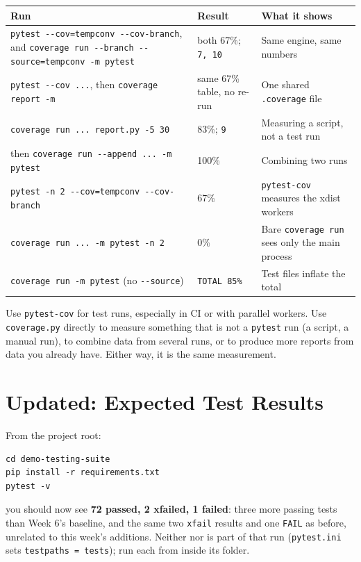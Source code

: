 \documentclass[11pt]{article}
\begin{document}
\begin{center}
\footnotesize
\begin{tabular}{@{}L{6.4cm}L{3.6cm}L{4.6cm}@{}}
\toprule
\textbf{Run} & \textbf{Result} & \textbf{What it shows} \\
\midrule
\texttt{pytest -{}-cov=tempconv -{}-cov-branch}, and
\texttt{coverage run -{}-branch -{}-source=tempconv -m pytest}
& both 67\%; \texttt{7, 10} & Same engine, same numbers \\
\texttt{pytest -{}-cov ...}, then \texttt{coverage report -m} & same
67\% table, no re-run & One shared \texttt{.coverage} file \\
\texttt{coverage run ... report.py -5 30} & 83\%; \texttt{9} & Measuring
a script, not a test run \\
then \texttt{coverage run -{}-append ... -m pytest} & 100\% & Combining
two runs \\
\texttt{pytest -n 2 -{}-cov=tempconv -{}-cov-branch} & 67\% &
\texttt{pytest-cov} measures the xdist workers \\
\texttt{coverage run ... -m pytest -n 2} & 0\% & Bare
\texttt{coverage run} sees only the main process \\
\texttt{coverage run -m pytest} (no \texttt{-{}-source}) & \texttt{TOTAL 85\%}
& Test files inflate the total \\
\bottomrule
\end{tabular}
\end{center}

\begin{keyidea}
Use \texttt{pytest-cov} for test runs, especially in CI or with parallel
workers. Use \texttt{coverage.py} directly to measure something that is
not a \texttt{pytest} run (a script, a manual run), to combine data from
several runs, or to produce more reports from data you already have.
Either way, it is the same measurement.
\end{keyidea}

\section{Updated: Expected Test Results}
From the project root:
\begin{lstlisting}[style=shellstyle]
cd demo-testing-suite
pip install -r requirements.txt
pytest -v
\end{lstlisting}
you should now see \textbf{72 passed, 2 xfailed, 1 failed}: three more
passing tests than Week 6's baseline, and the same two \texttt{xfail}
results and one \texttt{FAIL} as before, unrelated to this week's
additions. Neither  nor
 is part of that run
(\texttt{pytest.ini} sets \texttt{testpaths = tests}); run each from
inside its folder.
\end{document}
